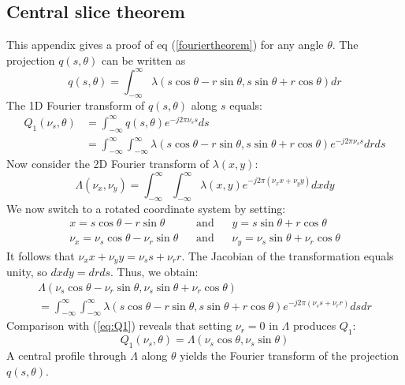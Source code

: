 \documentclass[11pt,oneside]{article}
\begin{document}
\subsection{Central slice theorem} \label{app:cs}
This appendix gives a proof of eq (\ref{fouriertheorem}) for any angle
$\theta$. The projection $q(s,\theta)$ can be written as
\begin{equation}
  q(s, \theta) = \int_{-\infty}^{\infty} \lambda(s \cos\theta - r\sin\theta, 
                                s \sin\theta + r\cos\theta) dr
\end{equation}
The 1D Fourier transform of $q(s,\theta)$ along $s$ equals:
\begin{align}
  Q_1(\nu_s, \theta) &= \int_{-\infty}^{\infty} q(s, \theta) e^{-j2\pi \nu_s s} ds \nonumber \\
  &= \int_{-\infty}^{\infty}\int_{-\infty}^{\infty}\lambda(s\cos\theta - r\sin\theta, 
                          s\sin\theta + r\cos\theta)e^{-j2\pi \nu_s s} dr ds
      \label{eq:Q1}
\end{align}
Now consider the 2D Fourier transform of $\lambda(x,y)$:
\begin{equation}
  \Lambda(\nu_x, \nu_y) = \int_{-\infty}^{\infty} \int_{-\infty}^{\infty} \lambda(x,y) 
       e^{-j2\pi (\nu_x x + \nu_y y)} dx dy
\end{equation}
We now switch to a rotated coordinate system by setting:
\begin{align}
   x = s \cos\theta - r\sin\theta \;\;\;&\mbox{and}& \;\;\;
   y = s\sin\theta + r\cos\theta\\
   \nu_x = \nu_s \cos\theta - \nu_r\sin\theta \;\;\;&\mbox{and}& \;\;\;
   \nu_y = \nu_s\sin\theta + \nu_r\cos\theta
\end{align}
It follows that $\nu_x x + \nu_y y = \nu_s s + \nu_r r$. The Jacobian
of the transformation equals unity, so $dx dy = dr ds$. Thus, we obtain:
\begin{multline}
\Lambda(\nu_s \cos\theta - \nu_r\sin\theta, 
      \nu_s\sin\theta + \nu_r\cos\theta) \\
   = \int_{-\infty}^{\infty} \int_{-\infty}^{\infty} 
     \lambda(s \cos\theta - r\sin\theta, s\sin\theta + r\cos\theta) 
       e^{-j2\pi (\nu_s s + \nu_r r)} ds dr
\end{multline}
Comparison with (\ref{eq:Q1}) reveals that setting $\nu_r = 0$ in
$\Lambda$ produces $Q_1$:
\begin{equation}
  Q_1(\nu_s, \theta) = \Lambda(\nu_s\cos\theta, \nu_s\sin\theta )
\end{equation}
A central profile through $\Lambda$ along $\theta$ yields the Fourier
transform of the projection $q(s,\theta)$.
\end{document}
